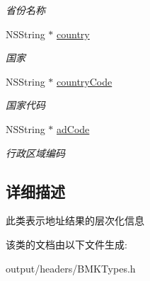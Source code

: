 \begin{DoxyCompactItemize}
\begin{DoxyCompactList}\small\item\em 省份名称 \end{DoxyCompactList}\item 
\hypertarget{interface_b_m_k_address_component_a06479df99f4bf3c669b84645d731af58}{}N\+S\+String $\ast$ \hyperlink{interface_b_m_k_address_component_a06479df99f4bf3c669b84645d731af58}{country}\label{interface_b_m_k_address_component_a06479df99f4bf3c669b84645d731af58}

\begin{DoxyCompactList}\small\item\em 国家 \end{DoxyCompactList}\item 
\hypertarget{interface_b_m_k_address_component_ad3e7f27c765aedf38a4124c9dc783177}{}N\+S\+String $\ast$ \hyperlink{interface_b_m_k_address_component_ad3e7f27c765aedf38a4124c9dc783177}{country\+Code}\label{interface_b_m_k_address_component_ad3e7f27c765aedf38a4124c9dc783177}

\begin{DoxyCompactList}\small\item\em 国家代码 \end{DoxyCompactList}\item 
\hypertarget{interface_b_m_k_address_component_a31774d4e5f60c7c722220f45fa4bdc32}{}N\+S\+String $\ast$ \hyperlink{interface_b_m_k_address_component_a31774d4e5f60c7c722220f45fa4bdc32}{ad\+Code}\label{interface_b_m_k_address_component_a31774d4e5f60c7c722220f45fa4bdc32}

\begin{DoxyCompactList}\small\item\em 行政区域编码 \end{DoxyCompactList}\end{DoxyCompactItemize}


\subsection{详细描述}
此类表示地址结果的层次化信息 

该类的文档由以下文件生成\+:\begin{DoxyCompactItemize}
\item 
output/headers/B\+M\+K\+Types.\+h\end{DoxyCompactItemize}
